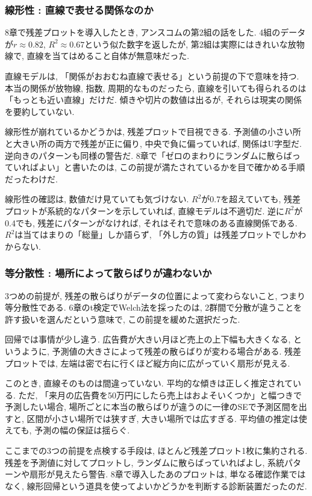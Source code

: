 \subsubsection*{線形性 : 直線で表せる関係なのか}

8章で残差プロットを導入したとき, アンスコムの第2組の話をした.
4組のデータが$r \approx 0.82$, $R^2 \approx 0.67$という似た数字を返したが, 第2組は実際にはきれいな放物線で, 直線を当てはめること自体が無意味だった.

直線モデルは, 「関係がおおむね直線で表せる」という前提の下で意味を持つ.
本当の関係が放物線, 指数, 周期的なものだったら, 直線を引いても得られるのは「もっとも近い直線」だけだ.
傾きや切片の数値は出るが, それらは現実の関係を要約していない.

線形性が崩れているかどうかは, 残差プロットで目視できる.
予測値の小さい所と大きい所の両方で残差が正に偏り, 中央で負に偏っていれば, 関係はU字型だ.
逆向きのパターンも同様の警告だ.
8章で「ゼロのまわりにランダムに散らばっていればよい」と書いたのは, この前提が満たされているかを目で確かめる手順だったわけだ.

線形性の確認は, 数値だけ見ていても気づけない.
$R^2$が0.7を超えていても, 残差プロットが系統的なパターンを示していれば, 直線モデルは不適切だ.
逆に$R^2$が0.4でも, 残差にパターンがなければ, それはそれで意味のある直線関係である.
$R^2$は当てはまりの「総量」しか語らず, 「外し方の質」は残差プロットでしかわからない.

\subsubsection*{等分散性 : 場所によって散らばりが違わないか}

3つめの前提が, 残差の散らばりがデータの位置によって変わらないこと, つまり等分散性である.
6章のt検定でWelch法を採ったのは, 2群間で分散が違うことを許す扱いを選んだという意味で, この前提を緩めた選択だった.

回帰では事情が少し違う.
広告費が大きい月ほど売上の上下幅も大きくなる, というように, 予測値の大きさによって残差の散らばりが変わる場合がある.
残差プロットでは, 左端は密で右に行くほど縦方向に広がっていく扇形が見える.

このとき, 直線そのものは間違っていない.
平均的な傾きは正しく推定されている.
ただ, 「来月の広告費を50万円にしたら売上はおよそいくつか」と幅つきで予測したい場合, 場所ごとに本当の散らばりが違うのに一律のSEで予測区間を出すと, 区間が小さい場所では狭すぎ, 大きい場所では広すぎる.
平均値の推定は使えても, 予測の幅の保証は揺らぐ.

ここまでの3つの前提を点検する手段は, ほとんど残差プロット1枚に集約される.
残差を予測値に対してプロットし, ランダムに散らばっていればよし, 系統パターンや扇形が見えたら警告.
8章で導入したあのプロットは, 単なる確認作業ではなく, 線形回帰という道具を使ってよいかどうかを判断する診断装置だったのだ.

